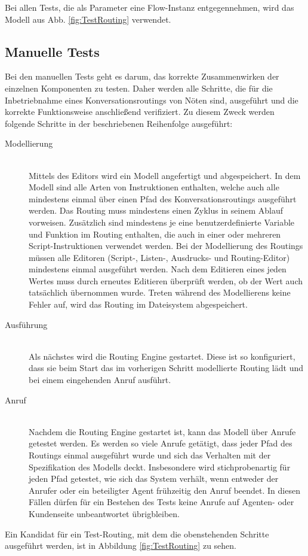 \noindent Bei allen Tests, die als Parameter eine Flow-Instanz entgegennehmen, wird das Modell aus Abb. \ref{fig:TestRouting} verwendet. 

\subsection{Manuelle Tests}
Bei den manuellen Tests geht es darum, das korrekte Zusammenwirken der einzelnen Komponenten zu testen. Daher werden alle Schritte, die für die Inbetriebnahme eines Konversationsroutings von Nöten sind, ausgeführt und die korrekte Funktionsweise anschließend verifiziert. Zu diesem Zweck werden folgende Schritte in der beschriebenen Reihenfolge ausgeführt:
\begin{description}
\item[Modellierung] \hfill \\
Mittels des Editors wird ein Modell angefertigt und abgespeichert. In dem Modell sind alle Arten von Instruktionen enthalten, welche auch alle mindestens einmal über einen Pfad des Konversationsroutings ausgeführt werden. Das Routing muss mindestens einen Zyklus in seinem Ablauf vorweisen. Zusätzlich sind mindestens je eine benutzerdefinierte Variable und Funktion im Routing enthalten, die auch in einer oder mehreren Script-Instruktionen verwendet werden. Bei der Modellierung des Routings müssen alle Editoren (Script-, Listen-, Ausdrucks- und Routing-Editor) mindestens einmal ausgeführt werden. Nach dem Editieren eines jeden Wertes muss durch erneutes Editieren überprüft werden, ob der Wert auch tatsächlich übernommen wurde. Treten während des Modellierens keine Fehler auf, wird das Routing im Dateisystem abgespeichert. 
\item[Ausführung] \hfill \\
Als nächstes wird die Routing Engine gestartet. Diese ist so konfiguriert, dass sie beim Start das im vorherigen Schritt modellierte Routing lädt und bei einem eingehenden Anruf ausführt.
\item[Anruf] \hfill \\
Nachdem die Routing Engine gestartet ist, kann das Modell über Anrufe getestet werden. Es werden so viele Anrufe getätigt, dass jeder Pfad des Routings einmal ausgeführt wurde und sich das Verhalten mit der Spezifikation des Modells deckt. Insbesondere wird stichprobenartig für jeden Pfad getestet, wie sich das System verhält, wenn entweder der Anrufer oder ein beteiligter Agent frühzeitig den Anruf beendet. In diesen Fällen dürfen für ein Bestehen des Tests keine Anrufe auf Agenten- oder Kundenseite unbeantwortet übrigbleiben.
\end{description}
Ein Kandidat für ein Test-Routing, mit dem die obenstehenden Schritte ausgeführt werden, ist in Abbildung \ref{fig:TestRouting} zu sehen.

